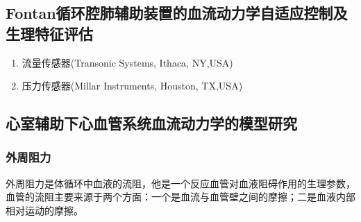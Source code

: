 \documentclass[titlepage,12pt]{article}
\begin{document}
\subsection{Fontan循环腔肺辅助装置的血流动力学自适应控制及生理特征评估}
\begin{enumerate}
    \item 流量传感器(Transonic Systems, Ithaca, NY,USA)
    \item 压力传感器(Millar Instruments, Houston, TX,USA)
\end{enumerate}
\subsection{心室辅助下心血管系统血流动力学的模型研究}
\subsubsection{外周阻力}
外周阻力是体循环中血液的流阻，他是一个反应血管对血液阻碍作用的生理参数，血管的流阻主要来源于两个方面：一个是血流与血管壁之间的摩擦；二是血液内部相对运动的摩擦。
\end{document}
